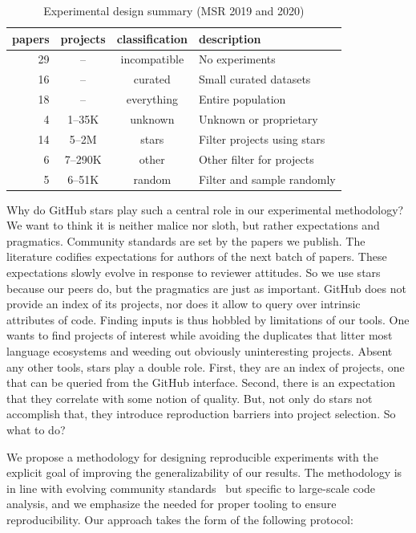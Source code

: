 \documentclass[sigconf,review,anonymous]{acmart}
\newcommand{\gh}{{GitHub}\xspace}
\begin{document}
\begin{table}[!h]
\begin{tabular}{@{}r@{~} c cl@{}}\toprule
\bf papers&\bf projects&\bf classification&\bf description\\\midrule\midrule%
 29 & --       & incompatible & No experiments\\
 16 & --       & curated      & Small curated datasets \\
 18 & --       & everything   & Entire population\\\midrule
  4 & 1--35K   & unknown      & Unknown or proprietary\\
 14 & 5--2M    & stars        & Filter projects using stars \\
  6 & 7--290K  & other        & Other filter for projects \\
  5 & 6--51K   & random       & Filter and sample randomly\\
 \bottomrule
\end{tabular}
\caption{Experimental design summary (MSR 2019 and 2020)}\label{tbl:msr-summary}
\end{table}

\vspace{-2mm}

\noindent
Why do \gh stars play such a central role in our experimental methodology? We
want to think it is neither malice nor sloth, but rather expectations and
pragmatics. Community standards are set by the papers we publish. The literature
codifies expectations for authors of the next batch of papers. These
expectations slowly evolve in response to reviewer attitudes. So we use stars
because our peers do, but the pragmatics are just as important. \gh does not
provide an index of its projects, nor does it allow to query over intrinsic
attributes of code. Finding inputs is thus hobbled by limitations of our tools.
One wants to find projects of interest while avoiding the duplicates that litter
most language ecosystems and weeding out obviously uninteresting projects.
Absent any other tools, stars play a double role. First, they are an index of
projects, one that can be queried from the \gh interface. Second, there is an
expectation that they correlate with some notion of quality.
But, not only do stars not accomplish that, they introduce reproduction barriers
into project selection. So what to do?

We propose a methodology for designing reproducible experiments with the
explicit goal of improving the generalizability of our results. The
methodology is in line with evolving community standards~\cite{Ralph:2021} but
specific to large-scale code analysis, and we emphasize the needed for proper
tooling to ensure reproducibility. Our approach takes the form of the following
protocol:
\end{document}
